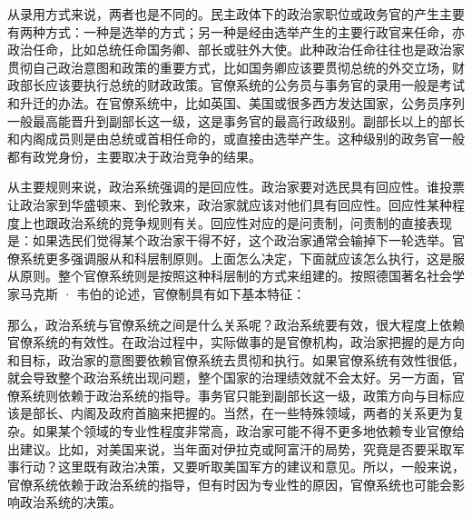 从录用方式来说，两者也是不同的。民主政体下的政治家职位或政务官的产生主要有两种方式：一种是选举的方式；另一种是经由选举产生的主要行政官来任命，亦政治任命，比如总统任命国务卿、部长或驻外大使。此种政治任命往往也是政治家贯彻自己政治意图和政策的重要方式，比如国务卿应该要贯彻总统的外交立场，财政部长应该要执行总统的财政政策。官僚系统的公务员与事务官的录用一般是考试和升迁的办法。在官僚系统中，比如英国、美国或很多西方发达国家，公务员序列一般最高能晋升到副部长这一级，这是事务官的最高行政级别。副部长以上的部长和内阁成员则是由总统或首相任命的，或直接由选举产生。这种级别的政务官一般都有政党身份，主要取决于政治竞争的结果。

从主要规则来说，政治系统强调的是回应性。政治家要对选民具有回应性。谁投票让政治家到华盛顿来、到伦敦来，政治家就应该对他们具有回应性。回应性某种程度上也跟政治系统的竞争规则有关。回应性对应的是问责制，问责制的直接表现是：如果选民们觉得某个政治家干得不好，这个政治家通常会输掉下一轮选举。官僚系统更多强调服从和科层制原则。上面怎么决定，下面就应该怎么执行，这是服从原则。整个官僚系统则是按照这种科层制的方式来组建的。按照德国著名社会学家马克斯 · 韦伯的论述，官僚制具有如下基本特征：


那么，政治系统与官僚系统之间是什么关系呢？政治系统要有效，很大程度上依赖官僚系统的有效性。在政治过程中，实际做事的是官僚机构，政治家把握的是方向和目标，政治家的意图要依赖官僚系统去贯彻和执行。如果官僚系统有效性很低，就会导致整个政治系统出现问题，整个国家的治理绩效就不会太好。另一方面，官僚系统则依赖于政治系统的指导。事务官只能到副部长这一级，政策方向与目标应该是部长、内阁及政府首脑来把握的。当然，在一些特殊领域，两者的关系更为复杂。如果某个领域的专业性程度非常高，政治家可能不得不更多地依赖专业官僚给出建议。比如，对美国来说，当年面对伊拉克或阿富汗的局势，究竟是否要采取军事行动？这里既有政治决策，又要听取美国军方的建议和意见。所以，一般来说，官僚系统依赖于政治系统的指导，但有时因为专业性的原因，官僚系统也可能会影响政治系统的决策。

